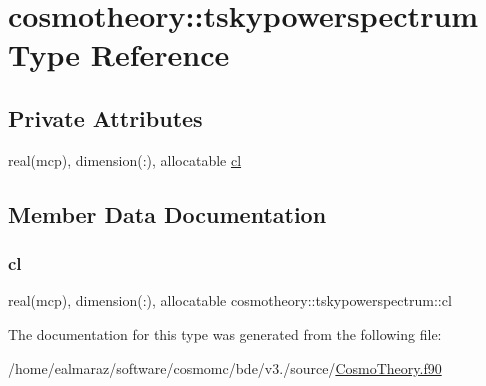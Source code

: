 \hypertarget{structcosmotheory_1_1tskypowerspectrum}{}\section{cosmotheory\+:\+:tskypowerspectrum Type Reference}
\label{structcosmotheory_1_1tskypowerspectrum}
\subsection*{Private Attributes}
\begin{DoxyCompactItemize}
\item 
real(mcp), dimension(\+:), allocatable \mbox{\hyperlink{structcosmotheory_1_1tskypowerspectrum_acb6940eee91682057e0b6170b90cb91f}{cl}}
\end{DoxyCompactItemize}


\subsection{Member Data Documentation}
\mbox{\label{structcosmotheory_1_1tskypowerspectrum_acb6940eee91682057e0b6170b90cb91f}} 
\subsubsection{\texorpdfstring{cl}{cl}}
{\footnotesize\ttfamily real(mcp), dimension(\+:), allocatable cosmotheory\+::tskypowerspectrum\+::cl\hspace{0.3cm}{\ttfamily [private]}}



The documentation for this type was generated from the following file\+:\begin{DoxyCompactItemize}
\item 
/home/ealmaraz/software/cosmomc/bde/v3./source/\mbox{\hyperlink{CosmoTheory_8f90}{Cosmo\+Theory.\+f90}}\end{DoxyCompactItemize}
